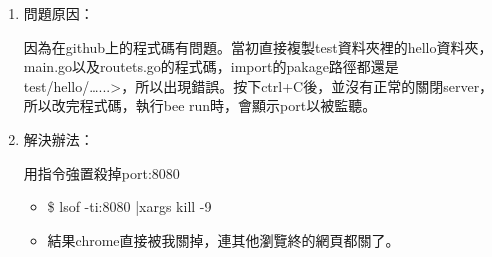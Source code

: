


\begin{enumerate}
\item 問題原因：

因為在github上的程式碼有問題。當初直接複製test資料夾裡的hello資料夾，main.go以及routets.go的程式碼，import的pakage路徑都還是test/hello/…...>，所以出現錯誤。按下ctrl+C後，並沒有正常的關閉server，所以改完程式碼，執行bee run時，會顯示port以被監聽。


\item 解決辦法：

用指令強置殺掉port:8080

	\begin{itemize}
	\item 
	\colorbox{mygray}{\$ lsof -ti:8080 |xargs kill -9}
	
	\item 結果chrome直接被我關掉，連其他瀏覽終的網頁都關了。
	
	
	\end{itemize}
\end{enumerate}




